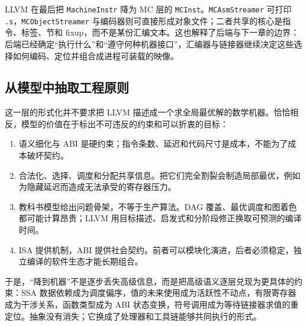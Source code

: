 LLVM 在最后把 \texttt{MachineInstr} 降为 MC 层的 \texttt{MCInst}。\texttt{MCAsmStreamer} 可打印 \texttt{.s}，\texttt{MCObjectStreamer} 与编码器则可直接形成对象文件；二者共享的核心是指令、标签、节和 fixup，而不是某份汇编文本\cite{llvm-codegen}。这也解释了后端与下一章的边界：后端已经确定“执行什么”和“遵守何种机器接口”，汇编器与链接器继续决定这些选择如何编码、定位并组合成进程可装载的映像。

\subsection{从模型中抽取工程原则}

这一层的形式化并不要求把 LLVM 描述成一个求全局最优解的数学机器。恰恰相反，模型的价值在于标出不可违反的约束和可以折衷的目标：
\begin{enumerate}
  \item 语义细化与 ABI 是硬约束；指令条数、延迟和代码尺寸是成本，不能为了成本破坏契约。
  \item 合法化、选择、调度和分配共享信息。把它们完全割裂会制造局部最优，例如为隐藏延迟而造成无法承受的寄存器压力。
  \item 教科书模型给出问题骨架，不等于生产算法。DAG 覆盖、最优调度和图着色都可能计算昂贵；LLVM 用目标描述、启发式和分阶段修正换取可预测的编译时间。
  \item ISA 提供机制，ABI 提供社会契约。前者可以模块化演进，后者必须稳定，独立编译的软件生态才能长期组合。
\end{enumerate}

于是，“降到机器”不是逐步丢失高级信息，而是把高级语义逐层兑现为更具体的约束：SSA 数据依赖成为调度偏序，值的未来使用成为活跃性不动点，有限寄存器成为干涉关系，函数类型成为 ABI 状态变换，符号调用成为等待链接器求值的重定位。抽象没有消失；它换成了处理器和工具链能够共同执行的形式。
